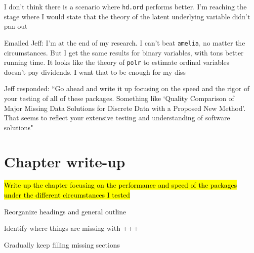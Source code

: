 \begin{coi}
		\item I don't think there is a scenario where \texttt{hd.ord} performs better. I'm reaching the stage where I would state that the theory of the latent underlying variable didn't pan out
		\item Emailed Jeff: I'm at the end of my research. I can't beat \texttt{amelia}, no matter the circumstances. But I get the same results for binary variables, with tons better running time. It looks like the theory of \texttt{polr} to estimate ordinal variables doesn't pay dividends. I want that to be enough for my diss
		\item Jeff responded: ``Go ahead and write it up focusing on the speed and the rigor of your testing of all of these packages. Something like `Quality Comparison of Major Missing Data Solutions for Discrete Data with a Proposed New Method'. That seems to reflect your extensive testing and understanding of software solutions"
	\end{coi}


\section*{Chapter write-up}
	\begin{coi}
		\item \hl{Write up the chapter focusing on the performance and speed of the packages under the different circumstances I tested}
		\item Reorganize headings and general outline
		\item Identify where things are missing with +++
		\item Gradually keep filling missing sections
	\end{coi}
	

			

